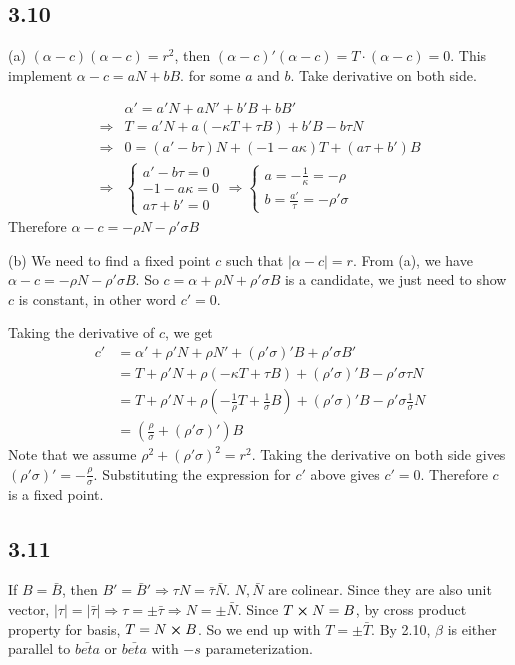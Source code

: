 \documentclass[12pt]{article}
\begin{document}
\subsection*{3.10}
(a)
$(\alpha-c)(\alpha - c) = r^2$, then $(\alpha-c)'(\alpha-c) = T \cdot (\alpha - c) = 0$. This implement $\alpha -c = aN + bB$. for some $a$ and $b$. Take derivative on both side. 

$$\begin{aligned}
	& \alpha' = a'N + a N' + b' B + b B' \\
	\Rightarrow &T = a'N + a(-\kappa T + \tau B) + b' B - b \tau N \\
	\Rightarrow &0 = (a' - b \tau )N + (-1 -a\kappa )T + (a\tau + b')B \\
	\Rightarrow &\begin{cases}
				a' - b \tau = 0 \\
				-1 -a\kappa = 0 \\
				a\tau + b' = 0
	\end{cases}
	\Rightarrow \begin{cases}
		a = -\frac{1}{\kappa} = -\rho \\
		b = \frac{a'}{\tau} = - \rho' \sigma
	\end{cases}
\end{aligned}$$
Therefore $\alpha - c = -\rho N - \rho' \sigma B$

(b) We need to find a fixed point $c$ such that $|\alpha - c| = r$. From (a), we have $\alpha - c = -\rho N - \rho' \sigma B$.  So $c= \alpha + \rho N + \rho'\sigma B$ is a candidate, we just need to show $c$ is constant, in other word $c' = 0$.

Taking the derivative of $c$, we get $$
  \begin{aligned}
  	c' &= \alpha' + \rho'N + \rho N' + (\rho'\sigma)'B + \rho'\sigma B' \\
  	&= T + \rho' N + \rho (-\kappa T + \tau B) + (\rho'\sigma)'B - \rho'\sigma \tau N \\
  	&= T + \rho' N + \rho (- \frac{1}{\rho} T + \frac{1}{\sigma} B) + (\rho'\sigma)'B - \rho'\sigma \frac{1}{\sigma} N \\
  	&= (\frac{\rho}{\sigma} + (\rho'\sigma)') B 
  \end{aligned}
$$
Note that we assume $\rho^2 + (\rho'\sigma)^2 = r^2$. Taking the derivative on both side gives $(\rho'\sigma)' = -\frac{\rho}{\sigma}$. Substituting the expression for $c'$ above gives $c'=0$. Therefore $c$ is a fixed point.  \QED


\subsection*{3.11}
If $B= \bar{B}$, then $B' = \bar{B}' \Rightarrow \tau N = \bar{\tau} \bar{N}$. $N, \bar{N}$ are colinear. Since they are also unit vector, $|\tau| = |\bar{\tau}| \Rightarrow \tau = \pm \bar{\tau} \Rightarrow N = \pm \bar{N}$. Since $T \cross N = B$, by cross product property for basis, $T = N \cross B$. So we end up with $T = \pm \bar{T}$.  By 2.10, $\beta$ is either parallel to $\bar{beta}$ or $\bar{beta}$ with $-s$ parameterization.
\end{document}
